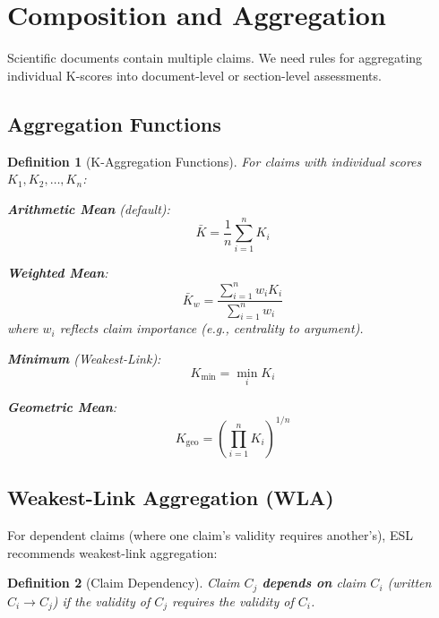 \documentclass[11pt,a4paper]{article}
\newtheorem{definition}{Definition}[section]
\theoremstyle{remark}
\begin{document}

\section{Composition and Aggregation}
\label{sec:composition}

Scientific documents contain multiple claims. We need rules for aggregating individual K-scores into document-level or section-level assessments.

\subsection{Aggregation Functions}

\begin{definition}[K-Aggregation Functions]
\label{def:aggregation}
For claims with individual scores $K_1, K_2, \ldots, K_n$:

\textbf{Arithmetic Mean} (default):
\begin{equation}
\bar{K} = \frac{1}{n} \sum_{i=1}^{n} K_i
\end{equation}

\textbf{Weighted Mean}:
\begin{equation}
\bar{K}_w = \frac{\sum_{i=1}^{n} w_i K_i}{\sum_{i=1}^{n} w_i}
\end{equation}
where $w_i$ reflects claim importance (e.g., centrality to argument).

\textbf{Minimum} (Weakest-Link):
\begin{equation}
K_{\min} = \min_{i} K_i
\end{equation}

\textbf{Geometric Mean}:
\begin{equation}
K_{\text{geo}} = \left( \prod_{i=1}^{n} K_i \right)^{1/n}
\end{equation}
\end{definition}

\subsection{Weakest-Link Aggregation (WLA)}

For dependent claims (where one claim's validity requires another's), ESL recommends weakest-link aggregation:

\begin{definition}[Claim Dependency]
\label{def:dependency}
Claim $C_j$ \textbf{depends on} claim $C_i$ (written $C_i \to C_j$) if the validity of $C_j$ requires the validity of $C_i$.
\end{definition}
\end{document}
